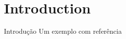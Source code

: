 \section{Introduction}

\begin{frame}{Introdução}
    Um exemplo com referência
    \cite{byron2012usingdrupal}
\end{frame}